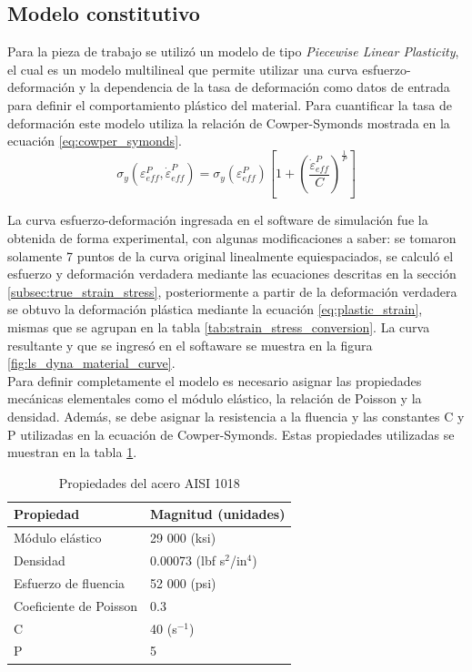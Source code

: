 \subsection{Modelo constitutivo}

Para la pieza de trabajo se utilizó un modelo de tipo \textit{Piecewise Linear Plasticity}, 
el cual es un modelo multilineal que permite utilizar una curva esfuerzo-deformación y la 
dependencia de la tasa de deformación como datos de entrada para definir el comportamiento 
plástico del material. Para cuantificar la tasa de deformación este modelo utiliza la 
relación de Cowper-Symonds mostrada en la ecuación \ref{eq:cowper_symonds}.\\

\begin{equation} \label{eq:cowper_symonds}
\sigma_{y}\left( \varepsilon _{eff}^{P},\dot{\varepsilon }_{eff}^{P} \right) = 
{{\sigma }_{y}}\left( \varepsilon _{eff}^{P} \right)\left[ 1+{{\left( \frac{\dot{\varepsilon }_{eff}^{P}}{C} \right)}^{\frac{1}{P}}} \right]
\end{equation}

La curva esfuerzo-deformación ingresada en el software de simulación fue la obtenida 
de forma experimental, con algunas modificaciones a saber: se tomaron solamente 7 puntos 
de la curva original linealmente equiespaciados, se calculó el esfuerzo y deformación verdadera 
mediante las ecuaciones descritas en la sección \ref{subsec:true_strain_stress}, posteriormente 
a partir de la deformación verdadera se obtuvo la deformación plástica mediante la 
ecuación \ref{eq:plastic_strain}, mismas que se agrupan en la tabla \ref{tab:strain_stress_conversion}.
La curva resultante y que se ingresó en el softaware se muestra en la figura \ref{fig:ls_dyna_material_curve}. \\

Para definir completamente el modelo es necesario asignar las propiedades mecánicas elementales 
como el módulo elástico, la relación de Poisson y la densidad. Además, se debe asignar 
la resistencia a la fluencia y las constantes C y P utilizadas en la ecuación de Cowper-Symonds.
Estas propiedades utilizadas se muestran en la tabla \ref{tab:material_properties}. \\

\begin{table}[h]
\centering
\caption{Propiedades del acero AISI 1018}
\label{tab:steel_properties}
\begin{tabular}{p{4cm} p{4cm}} \hline
Propiedad & Magnitud (unidades) \\
\hline
Módulo elástico & 29 000 (ksi) \\
Densidad & 0.00073 (lbf s$^2$/in$^4$) \\
Esfuerzo de fluencia & 52 000 (psi) \\
Coeficiente de Poisson & 0.3 \\
C & 40 (s$^{-1}$) \\
P & 5 \\
\hline
\end{tabular}
\label{tab:material_properties}
\end{table}

